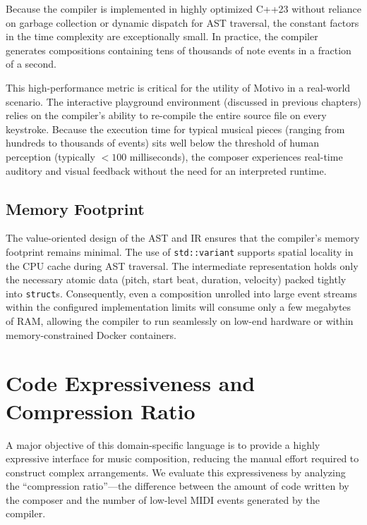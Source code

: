 Because the compiler is implemented in highly optimized C++23 without reliance on garbage collection or dynamic dispatch
for AST traversal, the constant factors in the time complexity are exceptionally small.
In practice, the compiler generates compositions containing tens of thousands of note events in a fraction of a second.

This high-performance metric is critical for the utility of Motivo in a real-world scenario.
The interactive playground environment (discussed in previous chapters) relies on the compiler's ability to re-compile
the entire source file on every keystroke.
Because the execution time for typical musical pieces (ranging from hundreds to thousands of events) sits well below the
threshold of human perception (typically $<100$ milliseconds), the composer experiences real-time auditory and visual
feedback without the need for an interpreted runtime.

\subsection{Memory Footprint}\label{detail-subsec:memory-footprint}

The value-oriented design of the AST and IR ensures that the compiler's memory footprint remains minimal.
The use of \texttt{std::variant} supports spatial locality in the CPU cache during AST traversal.
The intermediate representation holds only the necessary atomic data (pitch, start beat, duration, velocity) packed
tightly into \texttt{struct}s. Consequently, even a composition unrolled into large event streams within the
configured implementation limits will consume only a few
megabytes of RAM, allowing the compiler to run seamlessly on low-end hardware or within memory-constrained Docker
containers.


\section{Code Expressiveness and Compression Ratio}\label{detail-sec:evaluation-expressiveness}

A major objective of this domain-specific language is to provide a highly expressive interface for music composition,
reducing the manual effort required to construct complex arrangements.
We evaluate this expressiveness by analyzing the ``compression ratio''---the difference between the amount of
code written
by the composer and the number of low-level MIDI events generated by the compiler.

